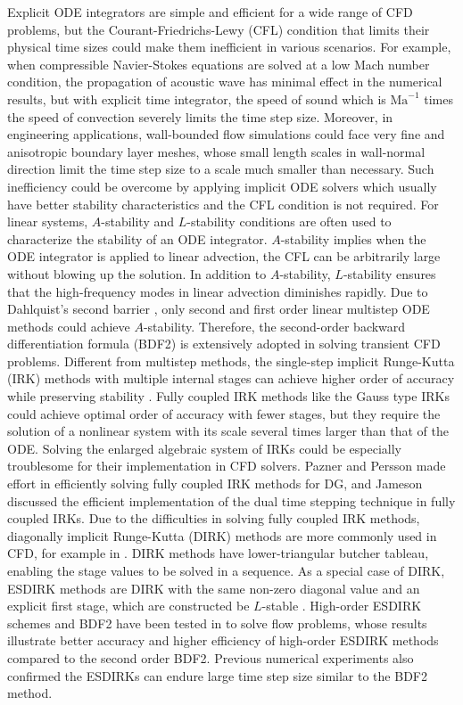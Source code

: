 Explicit ODE integrators
are simple and efficient for a wide range of
CFD problems, but the Courant-Friedrichs-Lewy (CFL) condition
that limits their physical time sizes
could make them inefficient in various
scenarios.
For example,
when compressible Navier-Stokes equations are solved at a low Mach number condition,
the propagation of acoustic wave has minimal effect in the numerical results,
but with explicit time integrator,
the speed of sound which is $\text{Ma}^{-1}$ times the
speed of convection
severely limits the time step size.
Moreover, in engineering applications,
wall-bounded flow simulations could face
very fine and anisotropic boundary layer meshes,
whose small length scales in wall-normal direction limit the time step size
to a scale much smaller than necessary.
Such inefficiency could be overcome by
applying implicit ODE solvers which
usually have better stability characteristics
and the CFL condition is not required.
For linear systems, $A$-stability and $L$-stability conditions \cite{wanner1996solving}
are often used to characterize the stability of an ODE integrator.
$A$-stability \cite{dahlquist1963special} implies
when the ODE integrator is applied to linear advection,
the CFL can be arbitrarily large without blowing up the solution.
In addition to $A$-stability, $L$-stability ensures that the high-frequency
modes in linear advection diminishes rapidly.
Due to Dahlquist's second barrier
\cite{dahlquist1963special},
only second and first order linear multistep ODE methods
could achieve $A$-stability.
Therefore,
the second-order backward differentiation formula (BDF2)
is extensively adopted in solving transient CFD problems.
Different from multistep methods,
the single-step implicit Runge-Kutta (IRK) methods
with multiple internal stages
can achieve higher order of accuracy while
preserving stability \cite{butcher2016ODEBook}.
Fully coupled IRK methods like the Gauss type IRKs
could achieve optimal order of accuracy
with fewer stages,
but they require the solution of a nonlinear
system with its scale several times larger
than that of the ODE.
Solving the enlarged algebraic system of IRKs
could be especially troublesome for their implementation in
CFD solvers.
Pazner and Persson
\cite{pazner2017stage}
made effort in efficiently solving
fully coupled IRK methods for DG, and
Jameson \cite{jameson2017evaluation}
discussed the efficient implementation of the dual time stepping
technique in fully coupled IRKs.
Due to the difficulties in solving
fully coupled IRK methods,
diagonally implicit Runge-Kutta (DIRK)
methods are more commonly used in CFD, for example in
\cite{wang2017compact_VR}.
DIRK methods have lower-triangular butcher tableau,
enabling the stage values to be solved in a sequence.
As a special case of DIRK,
ESDIRK methods are DIRK with the same non-zero diagonal value
and an explicit first stage,
which are constructed be $L$-stable
\cite{kennedy2003additiveARK,kvaerno2004singly}.
High-order ESDIRK schemes and
BDF2 have been tested in
\cite{bijl2002implicitBDFvESDIRK,wang2007implicitDGTests}
to solve flow problems,
whose results illustrate
better accuracy and higher efficiency
of high-order ESDIRK methods
compared to the second order BDF2.
Previous numerical experiments also confirmed
the ESDIRKs can endure large time step size 
similar to the BDF2 method.


